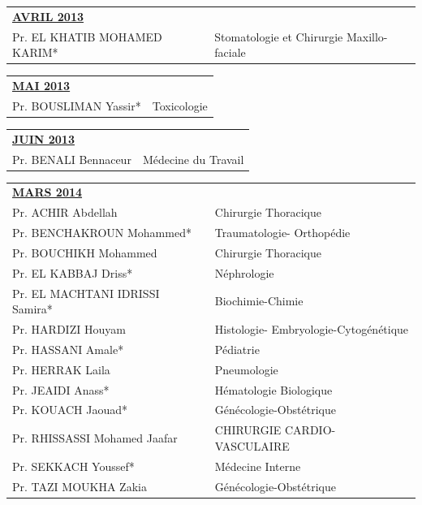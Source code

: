 \begin{table}[H]
  \begin{tabular}{l l}
    \multicolumn{2}{l}{\textbf{\underline{AVRIL 2013}}}\vspace*{0.5em}\\
    Pr. EL KHATIB MOHAMED KARIM* & Stomatologie et Chirurgie Maxillo-faciale \\
  \end{tabular}
\end{table}


\begin{table}[H]
  \begin{tabular}{l l}
    \multicolumn{2}{l}{\textbf{\underline{MAI 2013}}}\vspace*{0.5em}\\
    Pr. BOUSLIMAN Yassir* & Toxicologie \\
  \end{tabular}
\end{table}


\begin{table}[H]
  \begin{tabular}{l l}
    \multicolumn{2}{l}{\textbf{\underline{JUIN 2013}}}\vspace*{0.5em}\\
    Pr. BENALI Bennaceur & Médecine du Travail \\
  \end{tabular}
\end{table}


\begin{table}[H]
  \begin{tabular}{l l}
    \multicolumn{2}{l}{\textbf{\underline{MARS 2014}}}\vspace*{0.5em}\\
    Pr. ACHIR Abdellah & Chirurgie Thoracique \\
    Pr. BENCHAKROUN Mohammed* & Traumatologie- Orthopédie \\
    Pr. BOUCHIKH Mohammed & Chirurgie Thoracique \\
    Pr. EL KABBAJ Driss* & Néphrologie \\
    Pr. EL MACHTANI IDRISSI Samira* & Biochimie-Chimie \\
    Pr. HARDIZI Houyam & Histologie- Embryologie-Cytogénétique \\
    Pr. HASSANI Amale* & Pédiatrie \\
    Pr. HERRAK Laila & Pneumologie \\
    Pr. JEAIDI Anass* & Hématologie Biologique \\
    Pr. KOUACH Jaouad* & Génécologie-Obstétrique \\
    Pr. RHISSASSI Mohamed Jaafar & CHIRURGIE CARDIO-VASCULAIRE \\
    Pr. SEKKACH Youssef* & Médecine Interne \\
    Pr. TAZI MOUKHA Zakia & Génécologie-Obstétrique \\
  \end{tabular}
\end{table}


